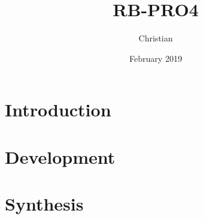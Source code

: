 \documentclass{report}
\title{RB-PRO4}
\author{Christian}
\date{February 2019}
\begin{document}

\maketitle

\begin{abstract}

\end{abstract}

\tableofcontents

\newpage
{}

\chapter{Introduction}


\chapter{Development}


\chapter{Synthesis}


\newpage

\newpage
\printbibliography
\end{document}
